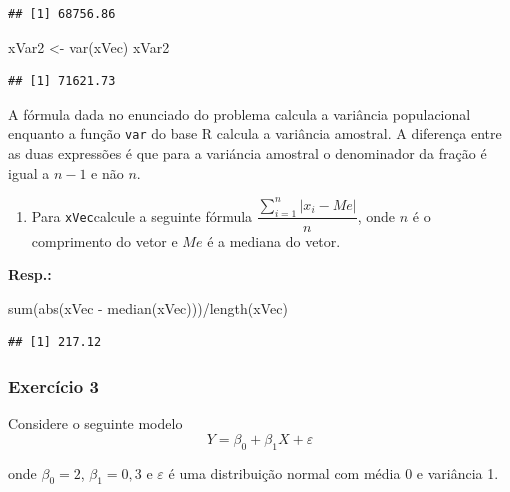 \documentclass[
]{article}
\newenvironment{Shaded}{\begin{snugshade}}{\end{snugshade}}
\newcommand{\FunctionTok}[1]{\textcolor[rgb]{0.00,0.00,0.00}{#1}}
\newcommand{\NormalTok}[1]{#1}
\newcommand{\OtherTok}[1]{\textcolor[rgb]{0.56,0.35,0.01}{#1}}
\newcommand{\SpecialCharTok}[1]{\textcolor[rgb]{0.00,0.00,0.00}{#1}}
\providecommand{\tightlist}{%
  \setlength{\itemsep}{0pt}\setlength{\parskip}{0pt}}
\begin{document}
\begin{verbatim}
## [1] 68756.86
\end{verbatim}

\begin{Shaded}
\begin{Highlighting}[]
\NormalTok{xVar2 }\OtherTok{\textless{}{-}} \FunctionTok{var}\NormalTok{(xVec)}
\NormalTok{xVar2}
\end{Highlighting}
\end{Shaded}

\begin{verbatim}
## [1] 71621.73
\end{verbatim}

A fórmula dada no enunciado do problema calcula a variância populacional enquanto a função \texttt{var} do base R calcula a variância amostral. A diferença entre as duas expressões é que para a variáncia amostral o denominador da fração é igual a \(n - 1\) e não \(n\).

\begin{enumerate}
\def\labelenumi{\arabic{enumi}.}
\setcounter{enumi}{8}
\tightlist
\item
  Para \texttt{xVec}calcule a seguinte fórmula \(\dfrac{\sum_{i=1}^n |x_i - Me| }{n}\), onde \(n\) é o comprimento do vetor e \(Me\) é a mediana do vetor.
\end{enumerate}

\textbf{Resp.:}

\begin{Shaded}
\begin{Highlighting}[]
\FunctionTok{sum}\NormalTok{(}\FunctionTok{abs}\NormalTok{(xVec }\SpecialCharTok{{-}} \FunctionTok{median}\NormalTok{(xVec)))}\SpecialCharTok{/}\FunctionTok{length}\NormalTok{(xVec)}
\end{Highlighting}
\end{Shaded}

\begin{verbatim}
## [1] 217.12
\end{verbatim}

\hypertarget{exercuxedcio-3}{%
\subsubsection{Exercício 3}\label{exercuxedcio-3}}

Considere o seguinte modelo \[Y = \beta_0 + \beta_1 X + \varepsilon\]

onde \(\beta_0 = 2\), \(\beta_1 = 0,3\) e \(\varepsilon\) é uma distribuição normal com média 0 e variância 1.
\end{document}
